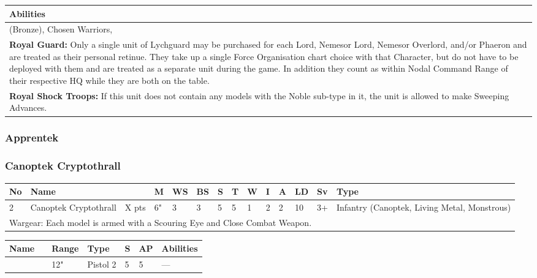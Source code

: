 \noindent
\begin{tabular}{||m{532pt}||}
	\hline
	Abilities \\
	\hline
	\quickref{Awakening Protocols} (Bronze), Chosen Warriors, \quickref{Reanimation Protocols} \\
	\textbf{Royal Guard:} Only a single unit of Lychguard may be purchased for each Lord, Nemesor Lord, Nemesor Overlord, and/or Phaeron and are treated as their personal retinue. They take up a single Force Organisation chart choice with that Character, but do not have to be deployed with them and are treated as a separate unit during the game. In addition they count as within Nodal Command Range of their respective HQ while they are both on the table. \\
	\textbf{Royal Shock Troops:} If this unit does not contain any models with the Noble sub-type in it, the unit is allowed to make Sweeping Advances. \\
	\hline
\end{tabular}


\newpage
\subsubsection{Apprentek}



\newpage
\subsubsection{Canoptek Cryptothrall}

\noindent
\begin{tabular}{||m{10pt} m{90pt} m{30pt} m{11pt} m{11pt} m{11pt} m{11pt} m{11pt} m{11pt} m{11pt} m{11pt} m{11pt} m{11pt} m{135pt}||}
	\hline
	No & Name & & M & WS & BS & S & T & W & I & A & LD & Sv & Type \\
	\hline
	2 & Canoptek Cryptothrall & X pts & 6" & 3 & 3 & 5 & 5 & 1 & 2 & 2 & 10 & 3+ & Infantry (Canoptek, Living Metal, Monstrous) \\
	\hline
	\hline
	\multicolumn{14}{||Z{532 pt}||}{Wargear: Each model is armed with a Scouring Eye and Close Combat Weapon.} \\
	\hline
\end{tabular}

\noindent
\begin{tabular}{||m{110pt} m{30pt} m{31pt} m{55pt} m{12pt} m{12pt} m{210pt}||}
	\hline
	Name & & Range & Type & S & AP & Abilities \\
	\hline
	\quickref{Scouring Eye} & & 12" & Pistol 2 & 5 & 5 & — \\
	\hline
\end{tabular}

